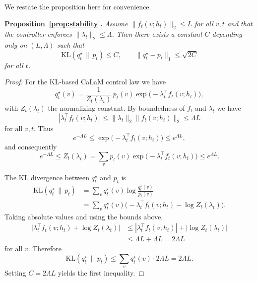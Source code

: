 \documentclass{article}
\theoremstyle{plain}
\theoremstyle{definition}
\theoremstyle{remark}
\begin{document}
We restate the proposition here for convenience.

\medskip
\noindent\textbf{Proposition~\ref{prop:stability}.}
\textit{
Assume $\|f_t(v;h_t)\|_2 \le L$ for all $v,t$ and that the controller enforces $\|\lambda_t\|_2 \le \Lambda$.
Then there exists a constant $C$ depending only on $(L,\Lambda)$ such that
\begin{equation}
  \mathrm{KL}(q_t^\star \,\|\, p_t) \le C,
  \qquad
  \|q_t^\star - p_t\|_1 \le \sqrt{2C}
\end{equation}
for all $t$.
}

\begin{proof}
For the KL-based CaLaM control law we have
\begin{equation}
  q_t^\star(v)
  =
  \frac{1}{Z_t(\lambda_t)}\,
  p_t(v)\exp\big(-\lambda_t^\top f_t(v;h_t)\big),
\end{equation}
with $Z_t(\lambda_t)$ the normalizing constant.
By boundedness of $f_t$ and $\lambda_t$ we have
\begin{equation}
  |\lambda_t^\top f_t(v;h_t)|
  \le \|\lambda_t\|_2 \|f_t(v;h_t)\|_2
  \le \Lambda L
\end{equation}
for all $v,t$.
Thus
\begin{equation}
  e^{-\Lambda L}
  \le
  \exp\big(-\lambda_t^\top f_t(v;h_t)\big)
  \le
  e^{\Lambda L},
\end{equation}
and consequently
\begin{equation}
  e^{-\Lambda L}
  \le
  Z_t(\lambda_t)
  =
  \sum_v p_t(v)\exp\big(-\lambda_t^\top f_t(v;h_t)\big)
  \le
  e^{\Lambda L}.
\end{equation}

The KL divergence between $q_t^\star$ and $p_t$ is
\begin{align}
  \mathrm{KL}(q_t^\star \,\|\, p_t)
  &=
  \sum_v q_t^\star(v)
  \log\frac{q_t^\star(v)}{p_t(v)} \\
  &=
  \sum_v q_t^\star(v)
  \Big(-\lambda_t^\top f_t(v;h_t) - \log Z_t(\lambda_t)\Big).
\end{align}
Taking absolute values and using the bounds above,
\begin{align}
  \Big|
  \lambda_t^\top f_t(v;h_t) + \log Z_t(\lambda_t)
  \Big|
  &\le
  |\lambda_t^\top f_t(v;h_t)| + |\log Z_t(\lambda_t)| \\
  &\le
  \Lambda L + \Lambda L
  = 2\Lambda L
\end{align}
for all $v$.
Therefore
\begin{equation}
  \mathrm{KL}(q_t^\star \,\|\, p_t)
  \le
  \sum_v q_t^\star(v)\cdot 2\Lambda L
  = 2\Lambda L.
\end{equation}
Setting $C = 2\Lambda L$ yields the first inequality.


\end{proof}
\end{document}
